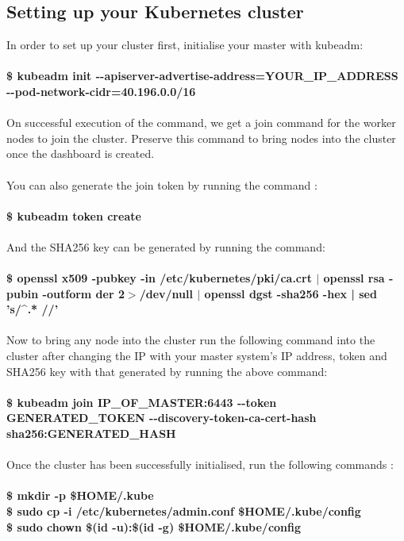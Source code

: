 \documentclass[12pt]{report}
\begin{document}
\subsection{Setting up your Kubernetes cluster}
In order to set up your cluster first, initialise your master with kubeadm:\\\\
\textbf{\$ kubeadm init  -{}-apiserver-advertise-address=YOUR\_IP\_ADDRESS    -{}-pod-network-cidr=40.196.0.0/16}\\\\
On successful execution of the command, we get a join command for the worker nodes to join the cluster. Preserve this command to bring nodes into the cluster once the dashboard is created.\\\\
You can also generate the join token by running the command :\\\\
\textbf{\$ kubeadm token create}\\\\
And the SHA256 key can be generated by running the command:\\\\
\textbf{\$ openssl x509 -pubkey -in /etc/kubernetes/pki/ca.crt $|$ openssl rsa -pubin -outform der 2$>$/dev/null $|$ openssl dgst -sha256 -hex | sed 's/\string^.* //'}\\\\
Now to bring any node into the cluster run the following command into the cluster after changing the IP with your master system’s IP address, token and SHA256 key with that generated by running the above command:\\\\
\textbf{\$ kubeadm join IP\_OF\_MASTER:6443 -{}-token GENERATED\_TOKEN -{}-discovery-token-ca-cert-hash sha256:GENERATED\_HASH}\\\\
Once the cluster has been successfully initialised, run the following commands :\\\\
\textbf{
	\$ mkdir -p \$HOME/.kube\\
	\$ sudo cp -i /etc/kubernetes/admin.conf \$HOME/.kube/config\\
	\$ sudo chown \$(id -u):\$(id -g) \$HOME/.kube/config
}
\end{document}
